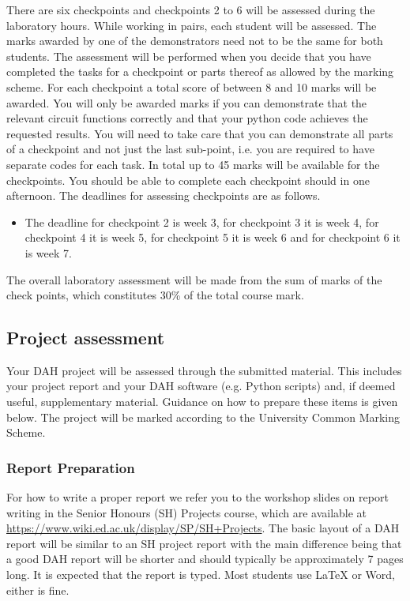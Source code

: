 There are six checkpoints and checkpoints 2 to 6 will be assessed during the laboratory hours. While working in pairs, each student will be assessed. The marks awarded by one of the demonstrators
need not to be the same for both students. 
The assessment will be performed when you decide that you have completed the tasks for a checkpoint or parts thereof as allowed by the marking scheme. For each checkpoint a total score of between 8 and 10 marks will be awarded. You will only be awarded marks if you can demonstrate that the relevant circuit functions correctly and that your python code achieves the requested results. 
You will need to take care that you can demonstrate all parts of a checkpoint and not just the last sub-point, i.e. you are required to have separate codes for each task. In total up to 45 marks will be available for the checkpoints. You should be able to complete each checkpoint should in one afternoon. The deadlines for assessing checkpoints are as follows.
\begin{itemize}
\item The deadline for checkpoint 2 is week 3,  for checkpoint 3 it is week 4, for checkpoint 4 it is week 5,  for checkpoint 5 it is week 6 and for checkpoint 6 it is week 7.
\end{itemize}
The overall laboratory assessment will be made from the sum of marks of the check points, which constitutes 30\% of the total course mark.

\subsection{Project assessment}

Your DAH project will be assessed through the submitted material. This includes your project report and your DAH software (e.g. Python scripts) and, if deemed useful, supplementary material. Guidance on how to prepare these items is given below. The project will be marked according to the University Common Marking Scheme. 

\subsubsection{Report Preparation}

For how to write a proper report we refer you to the workshop slides on report writing in the Senior Honours  (SH) Projects course, which are available at
\url{https://www.wiki.ed.ac.uk/display/SP/SH+Projects}.
The basic layout of a DAH report will be similar to an SH project report with the main difference being that a good DAH report will be shorter and should typically be approximately 7  pages long. It is expected that the report is typed. Most students use LaTeX or Word, either is fine.

